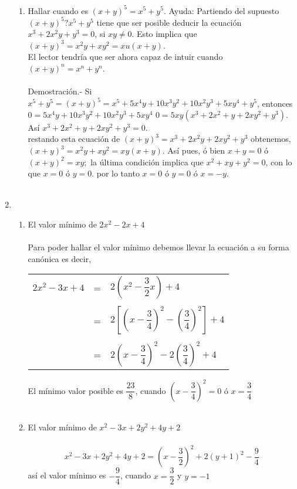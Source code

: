 \begin{enumerate}[\bfseries 1.]
\begin{enumerate}[\bfseries (a)]
\item Hallar cuando es $(x+y)^5=x^5+y^5$. Ayuda: Partiendo del supuesto $(x+y)^5?x^5+y^5$ tiene que ser posible deducir la ecuación $x^3+2x^2y+y^3=0$, si $xy\neq 0$. Esto implica que $(x+y)^3=x^2y+xy^2=xu(x+y)$.\\
El lector tendría que ser ahora capaz de intuir cuando $(x+y)^n=x^n+y^n$.\\\\
Demostración.- \; Si $x^5+y^5=(x+y)^5=x^5+5x^4y+10x^3y^2+10x^2y^3+5xy^4+y^5$, entonces $0=5x^4y+10x^3y^2+10x^2y^3+5xy^4$ $0=5xy(x^3+2x^2+y+2xy^2+y^3)$. Así $x^3+2x^2+y+2xy^2+y^3=0$.\\
restando esta ecuación de $(x+y)^3=x^3+2x^2y+2xy^2+y^3$ obtenemos, $(x+y)^3=x^2y+xy^2=xy(x+y)$. Así pues, ó bien $x+y=0$ ó $(x+y)^2=xy;$ la última condición implica que $x^2+xy+y^2=0$, con lo que $x=0$ ó $y=0$. por lo tanto $x=0$ ó $y=0$ ó $x=-y$.\\\\
\end{enumerate}

\item 
\begin{enumerate}[\bfseries (a)]
\item El valor mínimo de $2x^2-2x+4$\\\\
Para poder hallar el valor mínimo debemos llevar la ecuación a su forma canónica es decir, 
\begin{center}
\begin{tabular}{r c l}
$2x^2-3x+4$&=&$2\left( x^2-\dfrac{3}{2}x \right) +4$\\\\
&=&$2\left[ \left( x-\dfrac{3}{4} \right)^2 -\left(\dfrac{3}{4} \right)^2 \right]+4$\\\\
&=&$2\left( x-\dfrac{3}{4} \right)^2-2\left( \dfrac{3}{4} \right)^2+4$\\
\end{tabular}
\end{center}
El mínimo valor posible es $\dfrac{23}{8}$, cuando $\left(x-\dfrac{3}{4}\right)^2=0$ ó $x=\dfrac{3}{4}$\\\\

\item El valor mínimo de $x^2-3x+2y^2+4y+2$\\\\
$$x^2-3x+2y^2+4y+2=\left( x- \dfrac{3}{2} \right)^2+2(y+1)^2-\dfrac{9}{4}$$
así el valor mínimo es $-\dfrac{9}{4}$, cuando $x=\dfrac{3}{2}$ y $y=-1$\\\\


\end{enumerate}
\end{enumerate}
